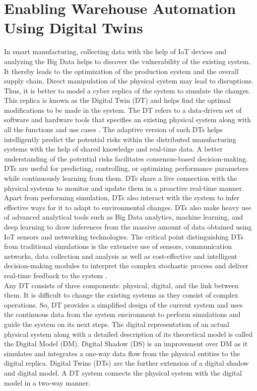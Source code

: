 \documentclass[paper=a4wide, fontsize=12pt]{scrartcl}	 %
\begin{document}
\section*{Enabling Warehouse Automation Using Digital Twins}

In smart manufacturing, collecting data with the help of IoT devices and analyzing the Big Data helps to discover the vulnerability of the existing system. It thereby leads to the optimization of the production system and the overall supply chain. Direct manipulation of the physical system may lead to disruptions. Thus, it is better to model a cyber replica of the system to simulate the changes. This replica is known as the Digital Twin (DT) and helps find the optimal modifications to be made in the system. The DT refers to a data-driven set of software and hardware tools that specifies an existing physical system along with all the functions and use cases \cite{fi14020064}. The adaptive version of such DTs helps intelligently predict the potential risks within the distributed manufacturing systems with the help of shared knowledge and real-time data. A better understanding of the potential risks facilitates consensus-based decision-making. \\

DTs are useful for predicting, controlling, or optimizing performance parameters while continuously learning from them. DTs share a live connection with the physical systems to monitor and update them in a proactive real-time manner. Apart from performing simulation, DTs also interact with the system to infer effective ways for it to adapt to environmental changes. DTs also make heavy use of advanced analytical tools such as Big Data analytics, machine learning, and deep learning to draw inferences from the massive amount of data obtained using IoT sensors and networking technologies. The critical point distinguishing DTs from traditional simulations is the extensive use of sensors, communication networks, data collection and analysis as well as cost-effective and intelligent decision-making modules to interpret the complex stochastic process and deliver real-time feedback to the system \cite{fi14020064}. \\

Any DT consists of three components: physical, digital, and the link between them. It is difficult to change the existing systems as they consist of complex operations. So, DT provides a simplified design of the current system and uses the continuous data from the system environment to perform simulations and guide the system on its next steps. The digital representation of an actual physical system along with a detailed description of its theoretical model is called the Digital Model (DM). Digital Shadow (DS) is an improvement over DM as it simulates and integrates a one-way data flow from the physical entities to the digital replica. Digital Twins (DTs) are the further extension of a digital shadow and digital model. A DT system connects the physical system with the digital model in a two-way manner. \\
\end{document}
